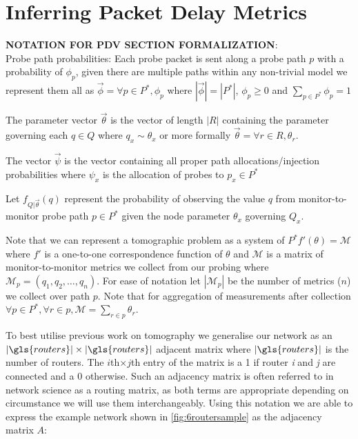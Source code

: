 \section{Inferring Packet Delay Metrics}
\label{sec:Mnetworkprobing}
\begin{mdframed}
\textbf{NOTATION FOR PDV SECTION FORMALIZATION}:\\
Probe path probabilities: Each probe packet is sent along a probe path $p$ with a probability of $\phi_p$, given there are multiple paths within any non-trivial model we represent them all as $\vec{\phi}=\forall p\in P^*, \phi_p$ where $|\vec{\phi}|=|P^*|$, $\phi_p \geq 0$ and $\sum_{p\in P^*}\phi_p = 1$

The parameter vector $\vec{\theta}$ is the vector of length $|R|$ containing the parameter governing each $q\in Q$ where $ q_x \sim \theta_x$ or more formally $\vec{\theta}=\forall r\in R, \theta_r$.

The vector $\vec{\psi}$ is the vector containing all proper path allocations/injection probabilities where $\psi_x$ is the allocation of probes to $p_x\in P^*$ 

Let $f_{Q|\vec{\theta}}(q)$ represent the probability of observing the value $q$ from monitor-to-monitor probe path $p\in P^*$ given the node parameter $\theta_x$ governing $Q_x$.

Note that we can represent a tomographic problem as a system of $P^*f'(\theta)=\mathcal{M}$ where $f'$ is a one-to-one correspondence function of $\theta$ and $\mathcal{M}$ is a matrix of monitor-to-monitor metrics we collect from our probing where $\mathcal{M}_p = (q_1,q_2,\ldots, q_n)$. For ease of notation let $|\mathcal{M}_p|$ be the number of metrics ($n$) we collect over path $p$. Note that for aggregation of measurements after collection $\forall p\in P^*, \forall r\in p, \mathcal{M}=\sum_{r\in p}\theta_r$.
\end{mdframed}

To best utilise previous work on tomography we generalise our network as an $|\gls{routers}|\times|\gls{routers}|$ adjacent matrix where $|\gls{routers}|$ is the number of routers. The $i$th$\times j$th entry of the matrix is a 1 if router \emph{i} and \emph{j} are connected and a 0 otherwise. Such an adjacency matrix is often referred to in network science as a routing matrix, as both terms are appropriate depending on circumstance we will use them interchangeably. Using this notation we are able to express the example network shown in \cref{fig:6routersample} as the adjacency matrix $A$:

